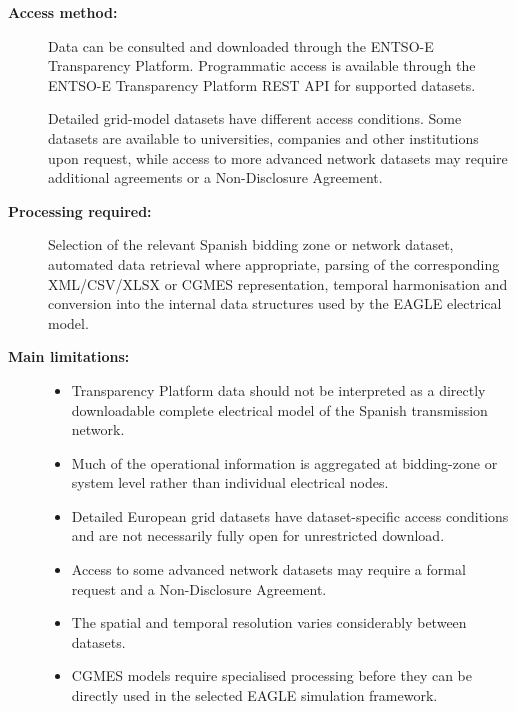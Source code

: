 \begin{description}
    \item[\textbf{Access method:}]
    Data can be consulted and downloaded through the ENTSO-E Transparency
    Platform. Programmatic access is available through the ENTSO-E
    Transparency Platform REST API for supported datasets.

    Detailed grid-model datasets have different access conditions.
    Some datasets are available to universities, companies and other
    institutions upon request, while access to more advanced network
    datasets may require additional agreements or a Non-Disclosure
    Agreement.

    \item[\textbf{Processing required:}]
    Selection of the relevant Spanish bidding zone or network dataset,
    automated data retrieval where appropriate, parsing of the corresponding
    XML/CSV/XLSX or CGMES representation, temporal harmonisation and
    conversion into the internal data structures used by the EAGLE
    electrical model.

    \item[\textbf{Main limitations:}] \hfill
    \begin{itemize}
        \item Transparency Platform data should not be interpreted as a
        directly downloadable complete electrical model of the Spanish
        transmission network.

        \item Much of the operational information is aggregated at
        bidding-zone or system level rather than individual electrical
        nodes.

        \item Detailed European grid datasets have dataset-specific access
        conditions and are not necessarily fully open for unrestricted
        download.

        \item Access to some advanced network datasets may require a formal
        request and a Non-Disclosure Agreement.

        \item The spatial and temporal resolution varies considerably
        between datasets.

        \item CGMES models require specialised processing before they can
        be directly used in the selected EAGLE simulation framework.
    \end{itemize}


\end{description}
